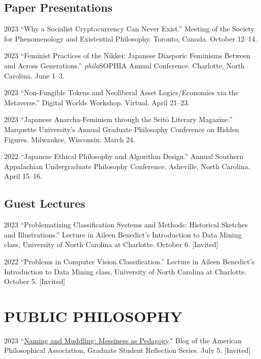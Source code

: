 \documentclass{article}
\begin{document}
\subsection*{\normalsize{Paper Presentations}}
\begin{tablist}
    \item[2023] \tab{}\enquote{Why a Socialist Cryptocurrency Can Never Exist.}  Meeting of the Society for Phenomenology and Existential Philosophy. Toronto, Canada. October 12--14.
    \item[2023] \tab{}\enquote{Feminist Practices of the Nikkei: Japanese Diasporic Feminisms Between and Across Generations.} \textit{philo}SOPHIA  Annual Conference. Charlotte, North Carolina. June 1--3.
    \item[2023] \tab{}\enquote{Non-Fungible Tokens and Neoliberal Asset Logics/Economies via the Metaverse.} Digital Worlds Workshop. Virtual. April 21--23.
    \item[2023] \tab{}\enquote{Japanese Anarcha-Feminism through the Seitō Literary Magazine.} Marquette University's Annual Graduate Philosophy Conference on Hidden Figures. Milwaukee, Wisconsin. March 24.
    \item[2022] \tab{}\enquote{Japanese Ethical Philosophy and Algorithm Design.}  Annual Southern Appalachian Undergraduate Philosophy Conference. Asheville, North Carolina. April 15--16.
\end{tablist}
\subsection*{\normalsize{Guest Lectures}}
\begin{tablist}
    \item[2023] \tab{}\enquote{Problematizing Classification Systems and Methods: Historical Sketches and Illustrations.} Lecture in Aileen Benedict's Introduction to Data Mining class, University of North Carolina at Charlotte. October 6. [Invited]
    \item[2022] \tab{}\enquote{Problems in Computer Vision Classification.} Lecture in Aileen Benedict's Introduction to Data Mining class, University of North Carolina at Charlotte. October 5. [Invited]
\end{tablist}

\section*{\normalsize{\MakeUppercase{Public Philosophy}}}
\begin{tablist}
    \item[2023] \tab{}\enquote{\href{https://blog.apaonline.org/2023/07/05/naming-and-muddling-messiness-as-pedagogy/}{Naming and Muddling: Messiness as Pedagogy}.} Blog of the American Philosophical Association, Graduate Student Reflection Series. July 5. [Invited]
\end{tablist}
\end{document}
